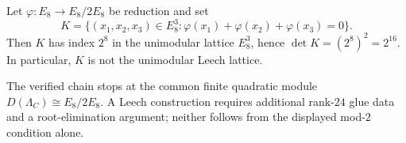 \begin{theorem}
\label{thm:moonshine}
Let $\varphi:E_8\to E_8/2E_8$ be reduction and set
$$K=\{(x_1,x_2,x_3)\in E_8^3:
\varphi(x_1)+\varphi(x_2)+\varphi(x_3)=0\}.$$
Then $K$ has index $2^8$ in the unimodular lattice $E_8^3$, hence
$\det K=(2^8)^2=2^{16}$. In particular, $K$ is not the unimodular Leech
lattice.
\end{theorem}

\begin{remark}
The verified chain stops at the common finite quadratic module
$D(\Lambda_C)\cong E_8/2E_8$. A Leech construction requires additional
rank-$24$ glue data and a root-elimination argument; neither follows from
the displayed mod-$2$ condition alone.
\end{remark}
